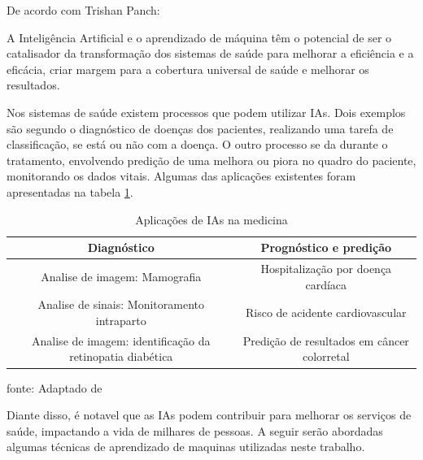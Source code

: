 \documentclass[
  12pt,		%
  a4paper,	%
  openright,%
  oneside,	%
  chapter=TITLE,		%
  section=TITLE,		%
  english,	%
  french,	%
  spanish,	%
  brazil	%
]{abntex2}
\begin{document}
    De acordo com Trishan Panch: 
    \vspace{1.5pt}
            \begin{flushright}
                \begin{minipage}{.724\textwidth}
                    {\SingleSpacing\small
                    A Inteligência Artificial e o aprendizado de máquina têm o potencial de ser o catalisador da transformação
dos sistemas de saúde para melhorar a eficiência e a eficácia, criar margem
para a cobertura universal de saúde e melhorar os resultados. \cite[p.1]{IA_health_systems}
                    }
                \end{minipage}
            \end{flushright}
            \vspace{1.5pt}

    Nos sistemas de saúde existem processos que podem utilizar IAs. Dois exemplos são segundo \cite[]{IA_health_systems}
    o diagnóstico de doenças dos pacientes, realizando uma tarefa de classificação, se está ou não com a doença. O outro processo
    se da durante o tratamento, envolvendo predição de uma melhora ou piora no quadro do paciente, monitorando os dados vitais. Algumas das
    aplicações existentes foram apresentadas na tabela \ref*{tabela aplicações IA Med}.

    \begin{table}[h]
        \centering
        \caption{Aplicações de IAs na medicina}
        \label{tabela aplicações IA Med}
        \begin{tabular}{cc}
            \hline
            \multicolumn{1}{|c|}{Diagnóstico} & \multicolumn{1}{c|}{Prognóstico e predição}\\
            \hline
            Analise de imagem: Mamografia & Hospitalização por doença cardíaca\\
            Analise de sinais: Monitoramento intraparto & Risco de acidente cardiovascular\\
            Analise de imagem: identificação da retinopatia diabética& Predição de resultados em câncer colorretal\\
            \hline
        \end{tabular}
        \par
        {\small fonte: Adaptado de \cite[]{IA_health_systems}}
    \end{table}

    Diante disso, é notavel que as IAs podem contribuir para melhorar os serviços de saúde, impactando a vida
    de milhares de pessoas. A seguir serão abordadas algumas técnicas de aprendizado de maquinas utilizadas neste trabalho.
\end{document}
